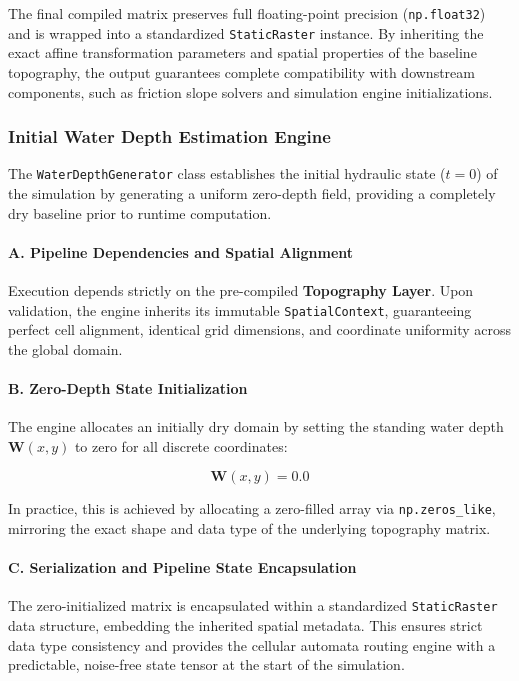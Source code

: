 The final compiled matrix preserves full floating-point precision (\texttt{np.float32}) and is wrapped into a standardized \texttt{StaticRaster} instance. By inheriting the exact affine transformation parameters and spatial properties of the baseline topography, the output guarantees complete compatibility with downstream components, such as friction slope solvers and simulation engine initializations.


\subsubsection{Initial Water Depth Estimation Engine}

The \texttt{WaterDepthGenerator} class establishes the initial hydraulic state ($t=0$) of the simulation by generating a uniform zero-depth field, providing a completely dry baseline prior to runtime computation.

\paragraph{A. Pipeline Dependencies and Spatial Alignment}
Execution depends strictly on the pre-compiled \textbf{Topography Layer}. Upon validation, the engine inherits its immutable \texttt{SpatialContext}, guaranteeing perfect cell alignment, identical grid dimensions, and coordinate uniformity across the global domain.

\paragraph{B. Zero-Depth State Initialization}
The engine allocates an initially dry domain by setting the standing water depth $\mathbf{W}(x,y)$ to zero for all discrete coordinates:

\begin{equation}
    \mathbf{W}(x,y) = 0.0
\end{equation}

In practice, this is achieved by allocating a zero-filled array via \texttt{np.zeros\_like}, mirroring the exact shape and data type of the underlying topography matrix.

\paragraph{C. Serialization and Pipeline State Encapsulation}
The zero-initialized matrix is encapsulated within a standardized \texttt{StaticRaster} data structure, embedding the inherited spatial metadata. This ensures strict data type consistency and provides the cellular automata routing engine with a predictable, noise-free state tensor at the start of the simulation.



